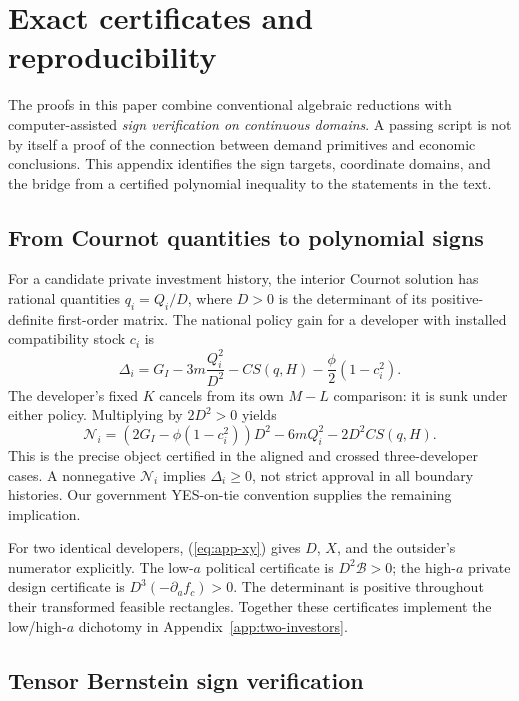 \section{Exact certificates and reproducibility}\label{app:certificates}

The proofs in this paper combine conventional algebraic reductions with computer-assisted \emph{sign verification on continuous domains}. A passing script is not by itself a proof of the connection between demand primitives and economic conclusions. This appendix identifies the sign targets, coordinate domains, and the bridge from a certified polynomial inequality to the statements in the text.

\subsection{From Cournot quantities to polynomial signs}

For a candidate private investment history, the interior Cournot solution has rational quantities \(q_i=Q_i/D\), where \(D>0\) is the determinant of its positive-definite first-order matrix. The national policy gain for a developer with installed compatibility stock \(c_i\) is
\[
 \Delta_i=G_I-3m\frac{Q_i^2}{D^2}
 -CS(q,H)-\frac{\phi}{2}(1-c_i^2).
\]
The developer's fixed \(K\) cancels from its own \(M-L\) comparison: it is sunk under either policy. Multiplying by \(2D^2>0\) yields
\begin{equation}
 \mathcal N_i
 =\left(2G_I-\phi(1-c_i^2)\right)D^2
  -6mQ_i^2-2D^2 CS(q,H).
 \label{eq:certificate-object}
\end{equation}
This is the precise object certified in the aligned and crossed three-developer cases. A nonnegative \(\mathcal N_i\) implies \(\Delta_i\ge0\), not strict approval in all boundary histories. Our government YES-on-tie convention supplies the remaining implication.

For two identical developers, (\ref{eq:app-xy}) gives \(D\), \(X\), and the outsider's numerator explicitly. The low-\(a\) political certificate is \(D^2\mathcal B>0\); the high-\(a\) private design certificate is \(D^3(-\partial_a f_c)>0\). The determinant is positive throughout their transformed feasible rectangles. Together these certificates implement the low/high-\(a\) dichotomy in Appendix~\ref{app:two-investors}.

\subsection{Tensor Bernstein sign verification}\label{app:bernstein}

